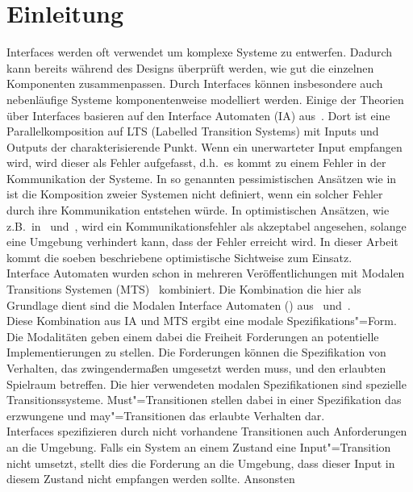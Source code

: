 \chapter*{Einleitung}

Interfaces werden oft verwendet um komplexe Systeme zu entwerfen. Dadurch kann
bereits während des Designs überprüft werden, wie gut die einzelnen Komponenten
zusammenpassen. Durch Interfaces können insbesondere auch nebenläufige
Systeme komponentenweise modelliert werden. Einige der Theorien über Interfaces
basieren auf den Interface Automaten (IA) aus~\cite{Alfaro2004}. Dort ist eine
Parallelkomposition auf LTS (Labelled Transition Systems) mit Inputs und
Outputs der charakterisierende Punkt. Wenn ein unerwarteter Input empfangen
wird, wird dieser als Fehler aufgefasst, d.h.\ es kommt zu einem Fehler in der
Kommunikation der Systeme. In so genannten pessimistischen Ansätzen wie
in~\cite{Bauer2010} ist die Komposition zweier Systemen nicht
definiert, wenn ein solcher Fehler durch ihre Kommunikation entstehen würde. In
optimistischen Ansätzen, wie z.B.\ in~\cite{Luttgen2013MIA1}
und~\cite{Vogler2016MIA3}, wird ein Kommunikationsfehler als akzeptabel
angesehen, solange eine Umgebung verhindert kann, dass der Fehler
erreicht wird. In dieser Arbeit kommt die soeben beschriebene optimistische
Sichtweise zum Einsatz.\\
Interface Automaten wurden schon in mehreren Veröffentlichungen mit Modalen
Transitions Systemen (MTS)~\cite{Larsen1989} kombiniert. Die Kombination die
hier als Grundlage dient sind die Modalen Interface Automaten (\MIA{})
aus~\cite{Luttgen2013MIA1} und~\cite{Vogler2016MIA3}.\\
Diese Kombination aus IA und MTS ergibt eine modale Spezifikations"=Form. Die
Modalitäten geben einem dabei die Freiheit Forderungen an potentielle
Implementierungen zu stellen. Die Forderungen können die Spezifikation von
Verhalten, das zwingendermaßen umgesetzt werden muss, und den erlaubten
Spielraum betreffen. Die hier verwendeten modalen Spezifikationen sind
spezielle Transitionssysteme. Must"=Transitionen stellen dabei in einer
Spezifikation das erzwungene und may"=Transitionen das erlaubte Verhalten
dar.\\
Interfaces spezifizieren durch nicht vorhandene Transitionen auch
Anforderungen an die Umgebung. Falls ein System an einem Zustand eine
Input"=Transition nicht umsetzt, stellt dies die Forderung an die Umgebung,
dass dieser Input in diesem Zustand nicht empfangen werden sollte. Ansonsten
